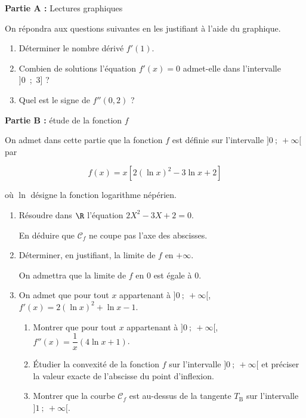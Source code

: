 \begin{center}\textbf{Partie A :} Lectures graphiques\end{center}

On répondra aux questions suivantes en les justifiant à l'aide du graphique.

\medskip
\begin{enumerate}
\item Déterminer le nombre dérivé $f'(1)$.
\item Combien de solutions l'équation $f'(x) = 0$ admet-elle dans l'intervalle ]0~;~3] ?
\item Quel est le signe de $f''(0,2)$ ?
\end{enumerate}


\begin{center}\textbf{Partie B :} étude de la fonction $f$\end{center}

On admet dans cette partie que la fonction $f$ est définie sur l'intervalle $]0~;~ +\infty[$ par

\[f(x) = x[2(\ln x)^2 - 3\ln x + 2 ]\]

où $\ln$ désigne la fonction logarithme népérien.

\medskip

\begin{enumerate}
\item Résoudre dans $\R$ l'équation $2X^2- 3X + 2 = 0$.

En déduire que $\mathcal{C}_f$ ne coupe pas l'axe des abscisses.
\item Déterminer, en justifiant, la limite de $f$ en $+\infty$.

On admettra que la limite de $f$ en 0 est égale à 0.
\item On admet que pour tout $x$ appartenant à $]0~;~ +\infty[$, \: $f'(x) = 2(\ln x)^2 + \ln x - 1$.
	\begin{enumerate}
		\item Montrer que pour tout $x$ appartenant à $]0~;~ +\infty[$,\: $f''(x)= \dfrac 1x(4\ln x + 1)$.
		\item Étudier la convexité de la fonction $f$ sur l'intervalle $]0~;~ +\infty[$ et préciser la valeur exacte de l'abscisse du point d'inflexion.
		\item Montrer que la courbe $\mathcal{C}_f$ est au-dessus de la tangente $T_{\text{B}}$ sur l'intervalle $]1~;~ +\infty[$.
	\end{enumerate}
\end{enumerate}


